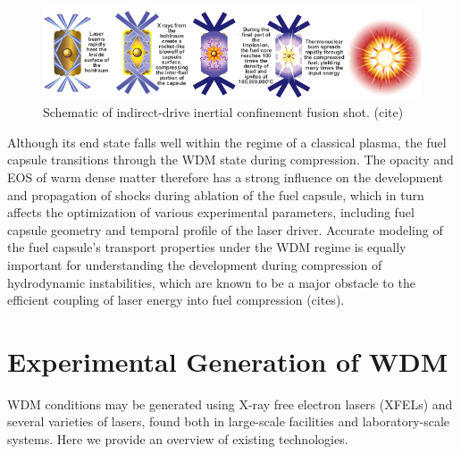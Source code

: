 \documentclass [11pt, proquest, article] {uwthesis}[2016/11/22]
\begin{document}
\begin{figure}[h] 
\caption{Schematic of indirect-drive inertial confinement fusion shot. (cite)}
\label{icf}
\centering
\includegraphics[scale=0.5]{../Figures/indirect-drive.jpg}
\end{figure}

Although its end state falls well within the regime of a classical plasma, the fuel capsule transitions through the WDM state during compression. The opacity and EOS of warm dense matter therefore has a strong influence on the development and propagation of shocks during ablation of the fuel capsule, which in turn affects the optimization of various experimental parameters, including fuel capsule geometry and temporal profile of the laser driver. Accurate modeling of the fuel capsule's transport properties under the WDM regime is equally important for understanding the development during compression of hydrodynamic instabilities, which are known to be a major obstacle to the efficient coupling of laser energy into fuel compression (cites).

\section{Experimental Generation of WDM}
WDM conditions may be generated using X-ray free electron lasers (XFELs) and several varieties of lasers, found both in large-scale facilities and laboratory-scale systems. Here we provide an overview of existing technologies. 
\end{document}
